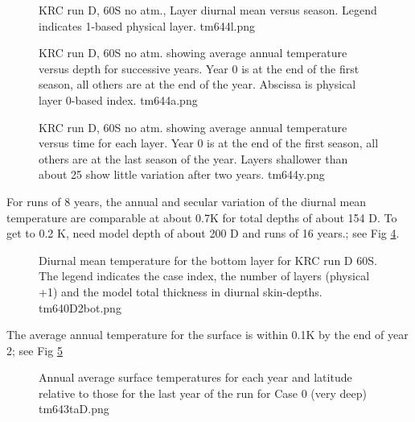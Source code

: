 \documentclass{article}
\begin{document}
\begin{figure}[!ht] 
\caption[60S no atm., Layer diurnal mean versus season ]{KRC run D, 60S no atm.,
  Layer diurnal mean versus season.  Legend indicates 1-based physical layer.
\label{tm644l} tm644l.png  }
\end{figure} 


\begin{figure}[!ht] 
\caption[60S no atm., successive years ]{KRC run D, 60S no atm. showing average
  annual temperature versus depth for successive years. Year 0 is at the end of
  the first season, all others are at the end of the year. Abscissa is physical
  layer 0-based index.
\label{tm644a} tm644a.png  }
\end{figure} 

\begin{figure}[!ht] 
\caption[60S no atm., successive years ]{KRC run D, 60S no atm. showing average
  annual temperature versus time for each layer.  Year 0 is at the end of the
  first season, all others are at the last season of the year. Layers shallower
  than about 25 show little variation after two years.
\label{tm644y} tm644y.png  }
\end{figure} 


For runs of 8 years, the annual and secular variation of the diurnal mean
temperature are comparable at about 0.7K for total depths of about 154 D. To get
to 0.2 K, need model depth of about 200 D and runs of 16 years.; see Fig
 \ref{tm640D2bot}.

\begin{figure}[!ht] 
\caption[KRC run D 60S bottom layers]{Diurnal mean temperature for the bottom
  layer for KRC run D 60S.  The legend indicates the case index, the number of
  layers (physical +1) and the model total thickness in diurnal skin-depths.
\label{tm640D2bot} tm640D2bot.png  }
\end{figure} 

The average annual temperature for the surface is within 0.1K by the end of year 2; see Fig \ref{tm643taD} 

\begin{figure}[!ht] 
\caption[Run D bottom]{Annual average surface temperatures for each year and
  latitude relative to those for the last year of the run for Case 0 (very deep)
\label{tm643taD}  tm643taD.png }
\end{figure} 
\end{document}
